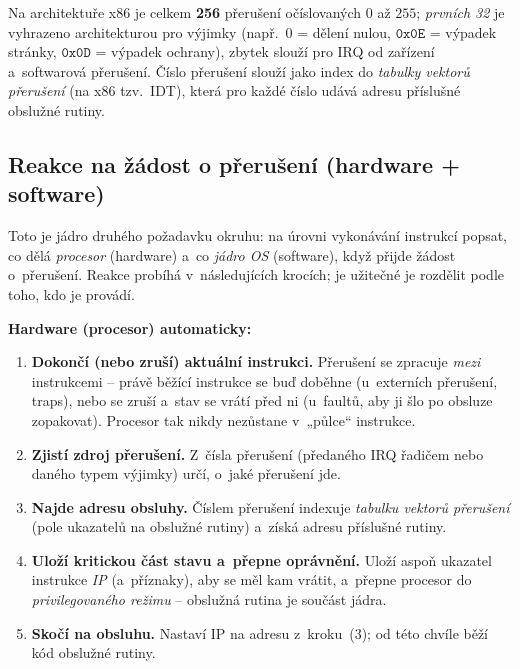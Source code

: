 \begin{poznamka}
Na architektuře x86 je celkem \textbf{256} přerušení očíslovaných $0$ až $255$; \emph{prvních 32} je vyhrazeno architekturou pro výjimky (např.\ $0$ = dělení nulou, $\texttt{0x0E}$ = výpadek stránky, $\texttt{0x0D}$ = výpadek ochrany), zbytek slouží pro IRQ od zařízení a~softwarová přerušení. Číslo přerušení slouží jako index do \emph{tabulky vektorů přerušení} (na x86 tzv.\ IDT), která pro každé číslo udává adresu příslušné obslužné rutiny.
\end{poznamka}

\subsection{Reakce na žádost o přerušení (hardware + software)}

Toto je jádro druhého požadavku okruhu: na úrovni vykonávání instrukcí popsat, co dělá \emph{procesor} (hardware) a~co \emph{jádro OS} (software), když přijde žádost o~přerušení. Reakce probíhá v~následujících krocích; je užitečné je rozdělit podle toho, kdo je provádí.

\smallskip
\noindent\textbf{Hardware (procesor) automaticky:}
\begin{enumerate}[label=(\arabic*)]
\item \textbf{Dokončí (nebo zruší) aktuální instrukci.} Přerušení se zpracuje \emph{mezi} instrukcemi -- právě běžící instrukce se buď doběhne (u~externích přerušení, traps), nebo se zruší a~stav se vrátí před ni (u~faultů, aby ji šlo po obsluze zopakovat). Procesor tak nikdy nezůstane v~„půlce`` instrukce.
\item \textbf{Zjistí zdroj přerušení.} Z~čísla přerušení (předaného IRQ řadičem nebo daného typem výjimky) určí, o~jaké přerušení jde.
\item \textbf{Najde adresu obsluhy.} Číslem přerušení indexuje \emph{tabulku vektorů přerušení} (pole ukazatelů na obslužné rutiny) a~získá adresu příslušné rutiny.
\item \textbf{Uloží kritickou část stavu a~přepne oprávnění.} Uloží aspoň ukazatel instrukce \emph{IP} (a~příznaky), aby se měl kam vrátit, a~přepne procesor do \emph{privilegovaného režimu} -- obslužná rutina je součást jádra.
\item \textbf{Skočí na obsluhu.} Nastaví IP na adresu z~kroku~(3); od této chvíle běží kód obslužné rutiny.
\end{enumerate}

